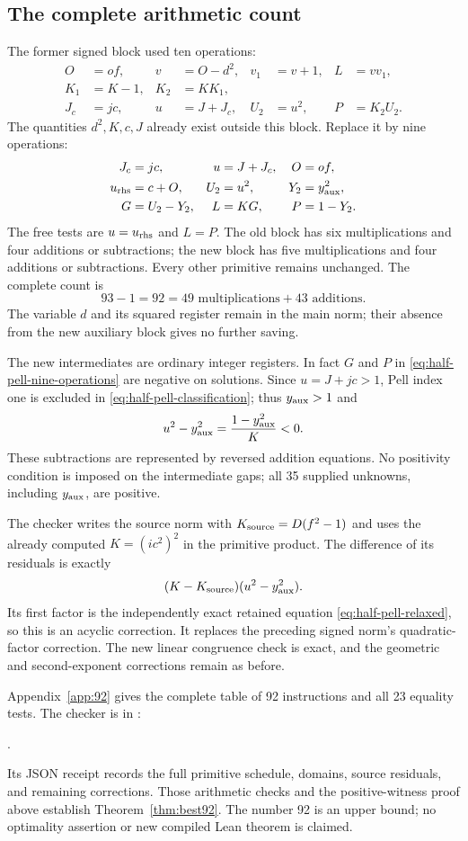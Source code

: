 \subsection{The complete arithmetic count}

The former signed block used ten operations:
\[
 \begin{aligned}
 O&=of,& v&=O-d^2,& v_1&=v+1,& L&=vv_1,\\
 K_1&=K-1,& K_2&=KK_1,\\
 J_c&=jc,& u&=J+J_c,& U_2&=u^2,& P&=K_2U_2.
 \end{aligned}
\]
The quantities $d^2,K,c,J$ already exist outside this block.
Replace it by nine operations:
\begin{equation}\label{eq:half-pell-nine-operations}
 \begin{aligned}
 J_c&=jc,& u&=J+J_c,& O&=of,\\
 u_{\rm rhs}&=c+O,& U_2&=u^2,& Y_2&=y_{\rm aux}^2,\\
 G&=U_2-Y_2,& L&=KG,& P&=1-Y_2.
 \end{aligned}
\end{equation}
The free tests are $u=u_{\rm rhs}$ and $L=P$. The old block
has six multiplications and four additions or subtractions; the new
block has five multiplications and four additions or subtractions.
Every other primitive remains unchanged. The complete count is
\[
 93-1=92=49\text{ multiplications}+43\text{ additions}.
\]
The variable $d$ and its squared register remain in the main norm;
their absence from the new auxiliary block gives no further saving.

The new intermediates are ordinary integer registers. In fact $G$
and $P$ in \eqref{eq:half-pell-nine-operations} are negative on
solutions. Since $u=J+jc>1$, Pell index one is excluded in
\eqref{eq:half-pell-classification}; thus $y_{\rm aux}>1$ and
\[
 u^2-y_{\rm aux}^2=\frac{1-y_{\rm aux}^2}{K}<0.
\]
These subtractions are represented by reversed addition equations.
No positivity condition is imposed on the intermediate gaps;
all 35 supplied unknowns, including $y_{\rm aux}$, are positive.

The checker writes the source norm with $K_{\rm source}=D(f^2-1)$
and uses the already computed $K=(ic^2)^2$ in the primitive product.
The difference of its residuals is exactly
\[
 (K-K_{\rm source})(u^2-y_{\rm aux}^2).
\]
Its first factor is the independently exact retained equation
\eqref{eq:half-pell-relaxed}, so this is an acyclic correction.
It replaces the preceding signed norm's quadratic-factor correction.
The new linear congruence check is exact, and the geometric and
second-exponent corrections remain as before.

Appendix~\ref{app:92} gives the complete table of 92 instructions
and all 23 equality tests. The checker is in
:
\begin{center}
\small{}.
\end{center}
Its JSON receipt records the full primitive schedule, domains, source
residuals, and remaining corrections. Those arithmetic checks and the
positive-witness proof above establish Theorem~\ref{thm:best92}.
The number 92 is an upper bound; no optimality assertion or new
compiled Lean theorem is claimed.
